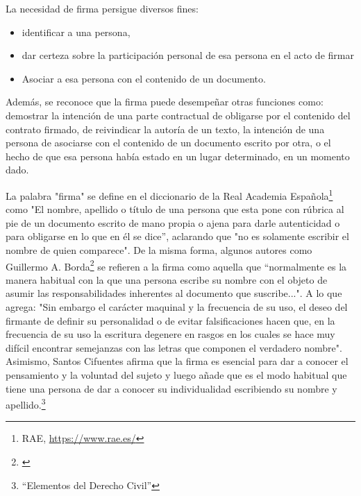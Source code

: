 \documentclass[12pt]{report} %
\begin{document}
\begin{itemize}
La necesidad de firma persigue diversos fines:

\begin{itemize}
    \item identificar a una persona,
    \item dar certeza sobre la participación personal de esa persona en el acto de firmar
    \item Asociar a esa persona con el contenido de un documento.
    
\end{itemize}

Además, se reconoce que la firma puede desempeñar otras funciones como: demostrar la intención de una parte contractual de obligarse por el contenido del contrato firmado, de reivindicar la autoría de un texto, la intención de una persona de asociarse con el contenido de un documento escrito por otra, o el hecho de que esa persona había estado en un lugar determinado, en un momento dado.

La palabra "firma" se define en el diccionario de la Real Academia Española\footnote{RAE, \url{https://www.rae.es/}}  como "El nombre, apellido o título de una persona que esta pone con rúbrica al pie de un documento escrito de mano propia o ajena para darle autenticidad o para obligarse en lo que en él se dice”, aclarando que "no es solamente escribir el nombre de quien comparece".  De la misma forma, algunos autores como  Guillermo A. Borda\footnote{\cite{Borda1999}} se refieren a la firma como aquella que “normalmente es la manera habitual con la que una persona escribe su nombre con el objeto de asumir las responsabilidades inherentes al documento que suscribe...". A lo que agrega: "Sin embargo el carácter maquinal y la frecuencia de su uso, el deseo del firmante de definir su personalidad o de evitar falsificaciones hacen que, en la frecuencia de su uso la escritura degenere en rasgos en los cuales se hace muy difícil encontrar semejanzas con las letras que componen el verdadero nombre".   Asimismo, Santos Cifuentes afirma que la firma es esencial para dar a conocer el pensamiento y la voluntad del sujeto y luego añade que es el modo habitual que tiene una persona de dar a conocer su individualidad escribiendo su nombre y apellido.\footnote{\cite{Santos1999}“Elementos del Derecho Civil”} 


\end{itemize}
\end{document}
